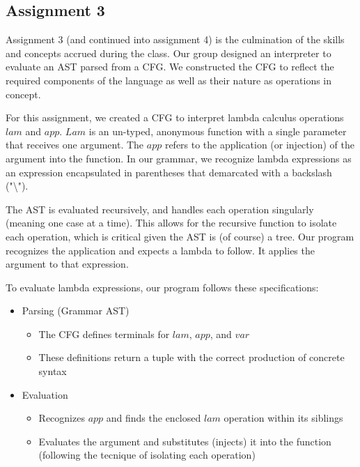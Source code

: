 \documentclass{article}
\theoremstyle{theorem}
\theoremstyle{definition}
\theoremstyle{remark}
\begin{document}
\subsection{Assignment 3}

Assignment 3 (and continued into assignment 4) is the culmination of the skills and concepts accrued during the class. Our group designed an interpreter to evaluate an AST parsed from a CFG. We constructed the CFG to reflect the required components of the language as well as their nature as operations in concept.

For this assignment, we created a CFG to interpret lambda calculus operations $lam$ and $app$. $Lam$ is an un-typed, anonymous function with a single parameter that receives one argument. The $app$ refers to the application (or injection) of the argument into the function. In our grammar, we recognize lambda expressions as an expression encapsulated in parentheses that demarcated with a backslash ("\textbackslash"). 

The AST is evaluated recursively, and handles each operation singularly (meaning one case at a time). This allows for the recursive function to isolate each operation, which is critical given the AST is (of course) a tree. Our program recognizes the application and expects a lambda to follow. It applies the argument to that expression. 

To evaluate lambda expressions, our program follows these specifications:

\begin{itemize}
  \item Parsing (Grammar \textrightarrow AST)
    \begin{itemize}
      \item The CFG defines terminals for $lam$, $app$, and $var$
      \item These definitions return a tuple with the correct production of concrete syntax
    \end{itemize}
  \item Evaluation
    \begin{itemize}
      \item Recognizes $app$ and finds the enclosed $lam$ operation within its siblings
      \item Evaluates the argument and substitutes (injects) it into the function (following the tecnique of isolating each operation)
    \end{itemize}
\end{itemize}
\end{document}
